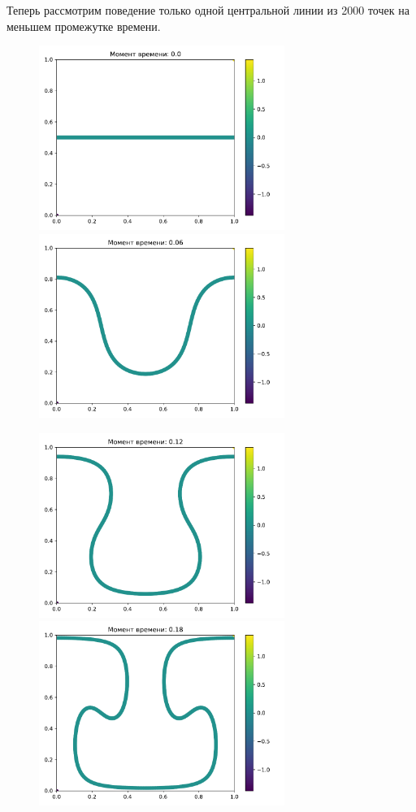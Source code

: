         Теперь рассмотрим поведение только одной центральной линии из 2000 точек на меньшем промежутке времени.  
        \begin{figure}[H]
            \centering
            \includegraphics[width=8cm]{pictures/line0.pdf}
            \includegraphics[width=8cm]{pictures/line3.pdf}
        \end{figure}
        \begin{figure}[H]
            \centering
            \includegraphics[width=8cm]{pictures/line6.pdf}
            \includegraphics[width=8cm]{pictures/line9.pdf}
        \end{figure}

